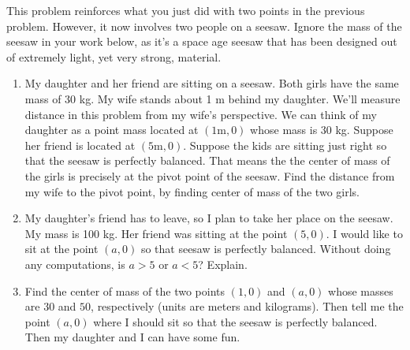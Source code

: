 \begin{problem}
 This problem reinforces what you just did with two points in the previous problem. However, it now involves two people on a seesaw. %
Ignore the mass of the seesaw in your work below, as it's a space age seesaw that has been designed out of extremely light, yet very strong, material. 
\begin{enumerate}
 \item 
 My daughter and her friend are sitting on a seesaw.  Both girls have the same mass of 30 kg. My wife stands about 1 m behind my daughter. We'll measure distance in this problem from my wife's perspective.  We can think of my daughter as a point mass located at $(1\text{m},0)$ whose mass is $30$ kg. Suppose her friend is located at $(5\text{m},0)$. Suppose the kids are sitting just right so that the seesaw is perfectly balanced.  That means the the center of mass of the girls is precisely at the pivot point of the seesaw. Find the distance from my wife to the pivot point, by finding center of mass of the two girls. 
 \item My daughter's friend has to leave, so I plan to take her place on the seesaw. My mass is 100 kg. Her friend was sitting at the point $(5,0)$. I would like to sit at the point $(a,0)$ so that seesaw is perfectly balanced. Without doing any computations, is $a>5$ or $a<5$? Explain.
 \item Find the center of mass of the two points $(1,0)$ and $(a,0)$ whose masses are $30$ and $50$, respectively (units are meters and kilograms). Then tell me the point $(a,0)$ where I should sit so that the seesaw is perfectly balanced. Then my daughter and I can have some fun.
\end{enumerate}
\end{problem}



